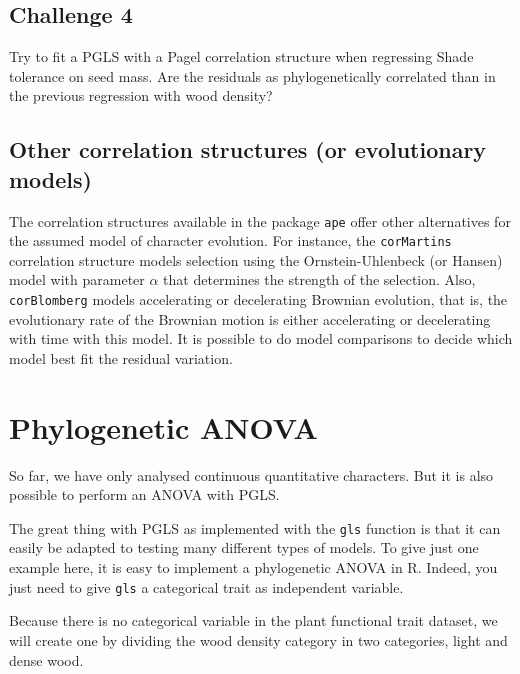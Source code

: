\documentclass[
]{book}
\newenvironment{Shaded}{\begin{snugshade}}{\end{snugshade}}
\newcommand{\AttributeTok}[1]{\textcolor[rgb]{0.13,0.29,0.53}{#1}}
\newcommand{\CommentTok}[1]{\textcolor[rgb]{0.56,0.35,0.01}{\textit{#1}}}
\newcommand{\DecValTok}[1]{\textcolor[rgb]{0.00,0.00,0.81}{#1}}
\newcommand{\FunctionTok}[1]{\textcolor[rgb]{0.13,0.29,0.53}{\textbf{#1}}}
\newcommand{\NormalTok}[1]{#1}
\newcommand{\OtherTok}[1]{\textcolor[rgb]{0.56,0.35,0.01}{#1}}
\newcommand{\SpecialCharTok}[1]{\textcolor[rgb]{0.81,0.36,0.00}{\textbf{#1}}}
\newcommand{\StringTok}[1]{\textcolor[rgb]{0.31,0.60,0.02}{#1}}
\begin{document}
\section{Challenge 4}\label{challenge-4}

Try to fit a PGLS with a Pagel correlation structure when regressing Shade tolerance on seed mass. Are the residuals as phylogenetically correlated than in the previous regression with wood density?

\section{Other correlation structures (or evolutionary models)}\label{other-correlation-structures-or-evolutionary-models}

The correlation structures available in the package \texttt{ape} offer other alternatives for the assumed model of character evolution. For instance, the \texttt{corMartins} correlation structure models selection using the Ornstein-Uhlenbeck (or Hansen) model with parameter \(\alpha\) that determines the strength of the selection. Also, \texttt{corBlomberg} models accelerating or decelerating Brownian evolution, that is, the evolutionary rate of the Brownian motion is either accelerating or decelerating with time with this model. It is possible to do model comparisons to decide which model best fit the residual variation.

\chapter{Phylogenetic ANOVA}\label{phylogenetic-anova}

So far, we have only analysed continuous quantitative characters. But it is also possible to perform an ANOVA with PGLS.

The great thing with PGLS as implemented with the \texttt{gls} function is that it can easily be adapted to testing many different types of models. To give just one example here, it is easy to implement a phylogenetic ANOVA in R. Indeed, you just need to give \texttt{gls} a categorical trait as independent variable.

Because there is no categorical variable in the plant functional trait dataset, we will create one by dividing the wood density category in two categories, light and dense wood.

\begin{Shaded}
\end{Shaded}
\end{document}
